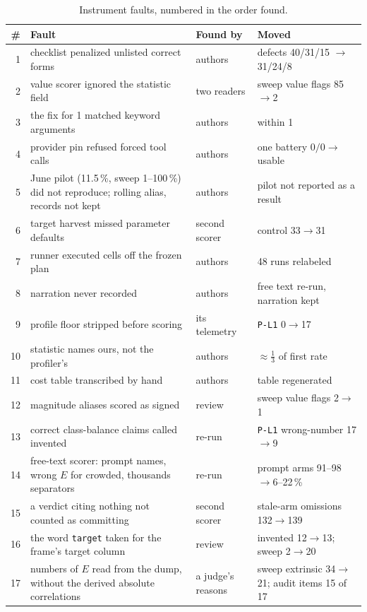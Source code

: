\documentclass[journal]{IEEEtran}
\begin{document}
\begin{table}[!htbp]
\caption{Instrument faults, numbered in the order found.}
\label{tab:corrections}
\centering
\footnotesize
\setlength{\tabcolsep}{2.4pt}
\begin{tabular}{@{}rp{3.55cm}lp{1.75cm}@{}}
\toprule
\# & Fault & Found by & Moved \\
\midrule
1  & checklist penalized unlisted correct forms & authors & defects 40/31/15 $\rightarrow$ 31/24/8 \\
2  & value scorer ignored the statistic field & two readers & sweep value flags 85$\rightarrow$2 \\
3  & the fix for 1 matched keyword arguments & authors & within 1 \\
4  & provider pin refused forced tool calls & authors & one battery $0/0\rightarrow$usable \\
5  & June pilot (11.5\,\%, sweep 1--100\,\%) did not reproduce; rolling alias, records not kept & authors & pilot not reported as a result \\
6  & target harvest missed parameter defaults & second scorer & control 33$\rightarrow$31 \\
7  & runner executed cells off the frozen plan & authors & 48 runs relabeled \\
8  & narration never recorded & authors & free text re-run, narration kept \\
9  & profile floor stripped before scoring & its telemetry & \texttt{P-L1} 0$\rightarrow$17 \\
10 & statistic names ours, not the profiler's & authors & ${\approx}\frac13$ of first rate \\
11 & cost table transcribed by hand & authors & table regenerated \\
12 & magnitude aliases scored as signed & review & sweep value flags 2$\rightarrow$1 \\
13 & correct class-balance claims called invented & re-run & \texttt{P-L1} wrong-number 17$\rightarrow$9 \\
14 & free-text scorer: prompt names, wrong $E$ for crowded, thousands separators & re-run & prompt arms 91--98$\rightarrow$6--22\,\% \\
15 & a verdict citing nothing not counted as committing & second scorer & stale-arm omissions 132$\rightarrow$139 \\
16 & the word \texttt{target} taken for the frame's target column & review & invented 12$\rightarrow$13; sweep 2$\rightarrow$20 \\
17 & numbers of $E$ read from the dump, without the derived absolute correlations & a judge's reasons & sweep extrinsic 34$\rightarrow$21; audit items 15 of 17 \\
\bottomrule
\end{tabular}
\end{table}
\end{document}
